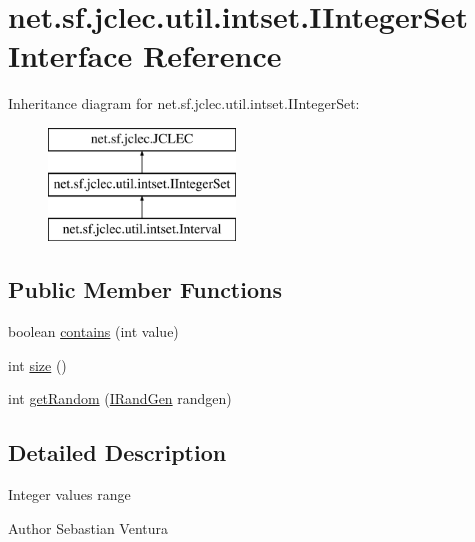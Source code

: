 \hypertarget{interfacenet_1_1sf_1_1jclec_1_1util_1_1intset_1_1_i_integer_set}{\section{net.\-sf.\-jclec.\-util.\-intset.\-I\-Integer\-Set Interface Reference}
\label{interfacenet_1_1sf_1_1jclec_1_1util_1_1intset_1_1_i_integer_set}
}
Inheritance diagram for net.\-sf.\-jclec.\-util.\-intset.\-I\-Integer\-Set\-:\begin{figure}[H]
\begin{center}
\leavevmode
\includegraphics[height=3.000000cm]{interfacenet_1_1sf_1_1jclec_1_1util_1_1intset_1_1_i_integer_set}
\end{center}
\end{figure}
\subsection*{Public Member Functions}
\begin{DoxyCompactItemize}
\item 
boolean \hyperlink{interfacenet_1_1sf_1_1jclec_1_1util_1_1intset_1_1_i_integer_set_a292698350c92df08c96a0caac84b0dcc}{contains} (int value)
\item 
int \hyperlink{interfacenet_1_1sf_1_1jclec_1_1util_1_1intset_1_1_i_integer_set_acb2fa7324b200795db31668519869f22}{size} ()
\item 
int \hyperlink{interfacenet_1_1sf_1_1jclec_1_1util_1_1intset_1_1_i_integer_set_a487b3610bab0761ac8ed8fb692ef8d69}{get\-Random} (\hyperlink{interfacenet_1_1sf_1_1jclec_1_1util_1_1random_1_1_i_rand_gen}{I\-Rand\-Gen} randgen)
\end{DoxyCompactItemize}


\subsection{Detailed Description}
Integer values range

\begin{DoxyAuthor}{Author}
Sebastian Ventura 
\end{DoxyAuthor}


